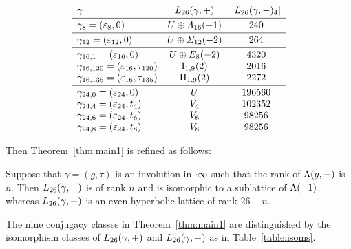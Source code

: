 \documentclass{amsart} %
\begin{document}
\begin{table}
\[
\begin{array}{lc  c }
\gamma &  \Lts(\gamma, +) & |\Lts(\gamma, -)_4|
\mystrutd{5pt} \\
\hline 
\gamma_{8}=(\vep_8, 0) & U\oplus \Lamsxtn(-1)  & 240
\mystruthd{10pt}{5pt} \\
\hline
\gamma_{12}=(\vep_{12}, 0) & U\oplus \Sigmatwlv(-2) & 264
\mystruthd{10pt}{5pt} \\
\hline
\mystruth{10pt}
\gamma_{16, 1}=(\vep_{16}, 0)  &U\oplus E_8(-2) &4320\\
\gamma_{16, 120} =(\vep_{16}, \tau_{120}) &   \typeILat_{1, 9}(2)  &2016\\
\gamma_{16, 135} =(\vep_{16},  \tau_{135}) & \typeIILat_{1, 9}(2) &2272
\mystrutd{5pt}\\
\hline
\mystruth{10pt}
\gamma_{24, 0}=( \vep_{24}, 0)&  U &196560\\
\gamma_{24, 4}=(\vep_{24},t_4)&  V_{4} & 102352 \\
\gamma_{24, 6}=( \vep_{24}, t_6) &  V_{6} &98256\\
\gamma_{24, 8}=( \vep_{24}, t_8) & V_{8}  &98256
\end{array}
\]
\vskip 10pt
\caption{$\Lts(\gamma, +)$ and $\Lts(\gamma,-)$}\label{table:isoms}
\end{table}
%
\par
Then Theorem~\ref{thm:main1}  is refined as follows:
%
\begin{theorem}\label{thm:main2}
Suppose that $\gamma=(g, \tau)$ is an involution 
in $\cdot \infty$ such that the rank of $\Lambda(g, -)$ is $n$.
Then $\Lts(\gamma, -)$ is of rank $n$ and is isomorphic to a sublattice of $\Lambda (-1)$, 
whereas  $\Lts(\gamma, +)$ is an even hyperbolic lattice of rank $26-n$.
\par
The nine conjugacy classes in  Theorem~\ref{thm:main1} are distinguished by 
the isomorphism classes of $\Lts(\gamma, +)$ and  $\Lts(\gamma,-)$ as in Table~\ref{table:isoms}.
\end{theorem}
\end{document}
